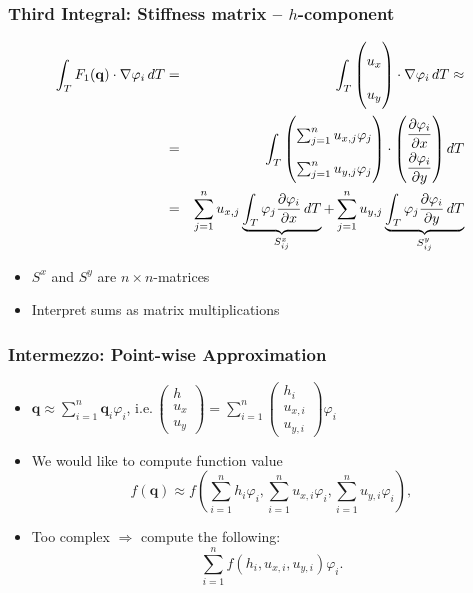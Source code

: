 \documentclass{beamer}
\newcommand{\pd}[2]{\dfrac{\partial #1}{\partial #2}}
\renewcommand{\phi}{\varphi}
\begin{document}
\begin{frame}
  \frametitle{Third Integral: Stiffness matrix -- $h$-component}
  \begin{eqnarray*}
    \int_T F_1(\mathbf{q}) \cdot \nabla \phi_i \, dT &=&
    \int_T
    \begin{pmatrix}
      u_x \\ u_y
    \end{pmatrix}
    \cdot \nabla \phi_i \, dT \approx \\
    &=& \int_T 
    \begin{pmatrix} 
      \sum_{j=1}^n u_{x,j} \phi_j \\
      \sum_{j=1}^n u_{y,j} \phi_j \\
    \end{pmatrix}
    \cdot 
    {
      \renewcommand\arraystretch{2}
      \begin{pmatrix}
        \pd{\phi_i}{x} \\
        \pd{\phi_i}{y} 
      \end{pmatrix} dT 
    }\\
    &=& \sum_{j=1}^n u_{x,j} \underbrace{\int_T \phi_j \pd{\phi_i}{x} \, dT}_{S^x_{ij}} + \sum_{j=1}^n u_{y,j} \underbrace{\int_T \phi_j \pd{\phi_i}{y} \, dT}_{S^y_{ij}}
  \end{eqnarray*}
  \begin{block}{}
    \begin{itemize}
    \item $S^x$ and $S^y$ are $n \times n$-matrices
    \item Interpret sums as matrix multiplications
    \end{itemize}
  \end{block}
\end{frame}

\begin{frame}
  \frametitle{Intermezzo: Point-wise Approximation}
  \begin{itemize}
  \item   $\mathbf{q}\approx \sum_{i=1}^n \mathbf{q}_i \phi_i$, i.e.\,$
    \begin{pmatrix}
      h \\ u_x \\ u_y
    \end{pmatrix} = \sum_{i=1}^n
    \begin{pmatrix}
      h_i \\ u_{x,i} \\ u_{y,i}
    \end{pmatrix}
    \phi_i$
  \item   We would like to compute function value
    \begin{equation*}
      f(\mathbf{q}) \approx 
      f\left(\sum_{i=1}^n h_i \phi_i,
        \sum_{i=1}^n u_{x,i} \phi_i,
        \sum_{i=1}^n u_{y,i} \phi_i\right),
    \end{equation*}
  \item   Too complex $\Rightarrow$ compute the following:
    \begin{equation*}
      \sum_{i=1}^n f(h_i,u_{x,i},u_{y,i}) \phi_i.
    \end{equation*}
  \end{itemize}
\end{frame}
\end{document}
